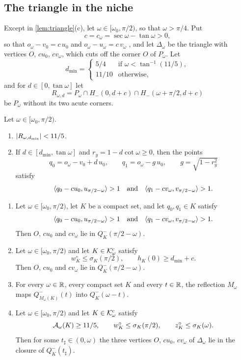 \subsection{The triangle in the niche}\label{sec:triangle}

Except in \cref{lem:triangle}(c), let $\omega\in[\omega_0,\pi/2)$, so that
$\omega>\pi/4$. Put
\[
  c=c_\omega=\sec\omega-\tan\omega>0,
\]
so that $o_\omega-v_0=c\,u_0$ and $o_\omega-u_\omega=c\,v_\omega$
, and let $\Delta_\omega$ be the triangle with vertices $O$,
$cu_0$, $cv_\omega$, which cuts off the corner $O$ of $P_\omega$. Let
\[
  d_{\min}=\begin{cases}
    5/4&\text{if }\omega<\tan^{-1}(11/5),\\
    11/10&\text{otherwise,}
  \end{cases}
\]
and for $d\in[0,\tan\omega]$ let
\[
  R_{\omega,d}=P_\omega\cap H_-(0,d+c)\cap H_-(\omega+\pi/2,d+c)
\]
be $P_\omega$ without its two acute corners.

\begin{fact}\label{fact:corner}
Let $\omega\in[\omega_0,\pi/2)$.
\begin{enumerate}[label=(\alph*)]
\item $\lvert R_{\omega,d_{\min}}\rvert<11/5$. 
\item If $d\in[d_{\min},\tan\omega]$ and $r_y=1-d\cot\omega\ge0$, then the
points
\[
  q_0=o_\omega-v_0+d\,u_0,\qquad q_1=o_\omega-g\,u_0,\qquad g=\sqrt{1-r_y^2}
\]
satisfy
\[
  \langle q_0-cu_0,u_{\pi/2-\omega}\rangle>1\quad\text{and}
    \quad\langle q_1-cv_\omega,v_{\pi/2-\omega}\rangle>1 .
\]
\end{enumerate}
\end{fact}

\begin{lemma}\label{lem:triangle}
\begin{enumerate}[label=(\alph*)]
\item Let $\omega\in[\omega_0,\pi/2)$, let $K$ be a compact set, and let
$q_0,q_1\in K$ satisfy
\[
  \langle q_0-cu_0,u_{\pi/2-\omega}\rangle>1\quad\text{and}
    \quad\langle q_1-cv_\omega,v_{\pi/2-\omega}\rangle>1 .
\]
Then $O$, $cu_0$ and $cv_\omega$ lie in $Q^-_K(\pi/2-\omega)$.
\item Let $\omega\in[\omega_0,\pi/2)$ and let $K\in\mathcal{K}^{\mathrm{c}}_\omega$ satisfy
\[
  w^\circ_K\le\sigma_K(\pi/2),\qquad h_K(0)\ge d_{\min}+c.
\]
Then $O$, $cu_0$ and $cv_\omega$ lie in $Q^-_K(\pi/2-\omega)$.
\item For every $\omega\in\mathbb{R}$, every compact set $K$ and every $t\in\mathbb{R}$, the
reflection $M_\omega$ maps $Q^-_{M_\omega(K)}(t)$ into $Q^-_K(\omega-t)$.
\item Let $\omega\in[\omega_0,\pi/2)$ and let $K\in\mathcal{K}^{\mathrm{c}}_\omega$ satisfy
\[
  \mathcal{A}_\omega(K)\ge11/5,\qquad w^\circ_K\le\sigma_K(\pi/2),\qquad
  z^\circ_K\le\sigma_K(\omega).
\]
Then for some $t_\sharp\in(0,\omega)$ the three vertices $O$, $cu_0$,
$cv_\omega$ of $\Delta_\omega$ lie in the closure of $Q^-_K(t_\sharp)$.
\end{enumerate}
\end{lemma}

